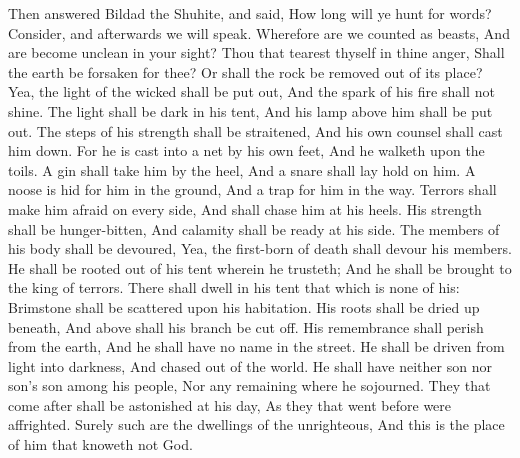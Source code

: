 Then answered Bildad the Shuhite, and said,  How long will ye hunt for words? Consider, and afterwards we will speak.  Wherefore are we counted as beasts, And are become unclean in your sight?  Thou that tearest thyself in thine anger, Shall the earth be forsaken for thee? Or shall the rock be removed out of its place?  Yea, the light of the wicked shall be put out, And the spark of his fire shall not shine.  The light shall be dark in his tent, And his lamp above him shall be put out.  The steps of his strength shall be straitened, And his own counsel shall cast him down.  For he is cast into a net by his own feet, And he walketh upon the toils.  A gin shall take him by the heel, And a snare shall lay hold on him.  A noose is hid for him in the ground, And a trap for him in the way.  Terrors shall make him afraid on every side, And shall chase him at his heels.  His strength shall be hunger-bitten, And calamity shall be ready at his side.  The members of his body shall be devoured, Yea, the first-born of death shall devour his members.  He shall be rooted out of his tent wherein he trusteth; And he shall be brought to the king of terrors.  There shall dwell in his tent that which is none of his: Brimstone shall be scattered upon his habitation.  His roots shall be dried up beneath, And above shall his branch be cut off.  His remembrance shall perish from the earth, And he shall have no name in the street.  He shall be driven from light into darkness, And chased out of the world.  He shall have neither son nor son’s son among his people, Nor any remaining where he sojourned.  They that come after shall be astonished at his day, As they that went before were affrighted.  Surely such are the dwellings of the unrighteous, And this is the place of him that knoweth not God. 


